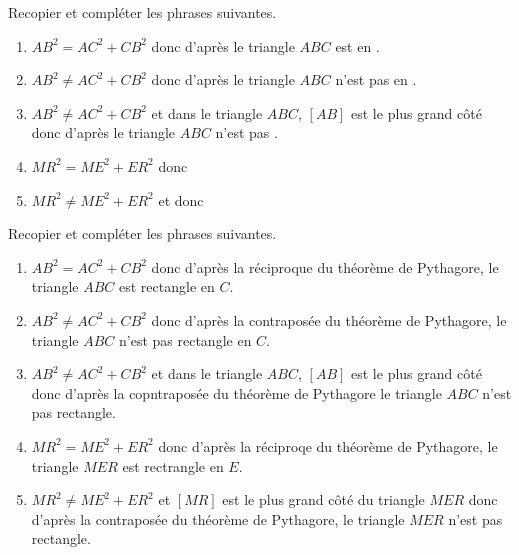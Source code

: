 \begin{exercice*}
    Recopier et compléter les phrases suivantes.
    \begin{enumerate}
        \item $AB^2=AC^2+CB^2$ donc d'après \makebox[0.1\linewidth]{\dotfill} le triangle $ABC$ est \makebox[0.1\linewidth]{\dotfill} en \makebox[0.1\linewidth]{\dotfill}.
        \item $AB^2\neq AC^2+CB^2$ donc d'après \makebox[0.1\linewidth]{\dotfill} le triangle $ABC$ n'est pas \makebox[0.1\linewidth]{\dotfill} en \makebox[0.1\linewidth]{\dotfill}.
        \item $AB^2\neq AC^2+CB^2$ et dans le triangle $ABC$, $[AB]$ est le plus grand côté donc d'après \makebox[0.1\linewidth]{\dotfill} le triangle $ABC$ n'est pas \makebox[0.1\linewidth]{\dotfill}.
        \item $MR^2=ME^2+ER^2$ donc \makebox[0.1\linewidth]{\dotfill}
        \item $MR^2\neq ME^2+ER^2$ et \makebox[0.1\linewidth]{\dotfill} donc \makebox[0.1\linewidth]{\dotfill}
    \end{enumerate}    
\end{exercice*}
\begin{corrige}
    Recopier et compléter les phrases suivantes.

    \begin{enumerate}
        \item $AB^2=AC^2+CB^2$ donc d'après {\red la réciproque du théorème de Pythagore,} le triangle $ABC$ est {\red rectangle} en {\red $C$}.
        \item $AB^2\neq AC^2+CB^2$ donc d'après {\red la contraposée du théorème de Pythagore,} le triangle $ABC$ n'est pas {\red rectangle} en {\red $C$}.
    \end{enumerate}
    \Coupe
    \begin{enumerate}
        \setcounter{enumi}{2}
        \item $AB^2\neq AC^2+CB^2$ et dans le triangle $ABC$, $[AB]$ est le plus grand côté donc d'après {\red la copntraposée du théorème de Pythagore} le triangle $ABC$ n'est pas {\red rectangle}.
        \item $MR^2=ME^2+ER^2$ donc {\red d'après la réciproqe du théorème de Pythagore, le triangle $MER$ est rectrangle en $E$.}
        \item $MR^2\neq ME^2+ER^2$ et {\red $[MR]$ est le plus grand côté du triangle $MER$} donc {\red d'après la contraposée du théorème de Pythagore, le triangle $MER$ n'est pas rectangle.}
    \end{enumerate}
\end{corrige}

